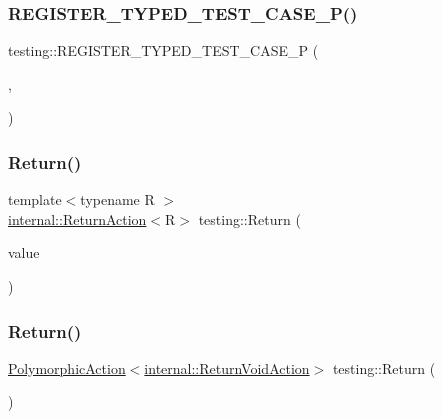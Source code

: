 \mbox{\label{namespacetesting_a9fc96ebb1c0e7db169c4a5697c903f56}} 
\subsubsection{\texorpdfstring{REGISTER\_TYPED\_TEST\_CASE\_P()}{REGISTER\_TYPED\_TEST\_CASE\_P()}}
{\footnotesize\ttfamily testing\+::\+R\+E\+G\+I\+S\+T\+E\+R\+\_\+\+T\+Y\+P\+E\+D\+\_\+\+T\+E\+S\+T\+\_\+\+C\+A\+S\+E\+\_\+P (\begin{DoxyParamCaption}\item[{\mbox{\hyperlink{classtesting_1_1CodeLocationForTYPEDTESTP}{Code\+Location\+For\+T\+Y\+P\+E\+D\+T\+E\+S\+TP}}}]{,  }\item[{Verify}]{ }\end{DoxyParamCaption})}

\mbox{\label{namespacetesting_af6d1c13e9376c77671e37545cd84359c}} 
\subsubsection{\texorpdfstring{Return()}{Return()}\hspace{0.1cm}{\footnotesize\ttfamily [1/2]}}
{\footnotesize\ttfamily template$<$typename R $>$ \\
\mbox{\hyperlink{classtesting_1_1internal_1_1ReturnAction}{internal\+::\+Return\+Action}}$<$R$>$ testing\+::\+Return (\begin{DoxyParamCaption}\item[{R}]{value }\end{DoxyParamCaption})}

\mbox{\label{namespacetesting_a8da8e53d2e7bc4e3c531f7435ad04823}} 
\subsubsection{\texorpdfstring{Return()}{Return()}\hspace{0.1cm}{\footnotesize\ttfamily [2/2]}}
{\footnotesize\ttfamily \mbox{\hyperlink{classtesting_1_1PolymorphicAction}{Polymorphic\+Action}}$<$\mbox{\hyperlink{classtesting_1_1internal_1_1ReturnVoidAction}{internal\+::\+Return\+Void\+Action}}$>$ testing\+::\+Return (\begin{DoxyParamCaption}{ }\end{DoxyParamCaption})\hspace{0.3cm}{\ttfamily [inline]}}

